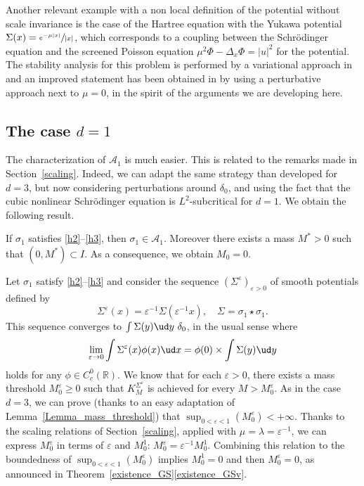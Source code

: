 \begin{rmk}
Another relevant example with
a non local definition of the potential without scale invariance is the case of the Hartree equation with the Yukawa potential $\Sigma(x)=\sfrac{e^{-\mu|x|}}{|x|}$,
which corresponds to a coupling between the Schrödinger equation and the screened Poisson equation $\mu^{2}\Phi-\Delta_{x}\Phi=|u|^{2}$
for the potential.
The stability analysis for this problem is performed by a variational approach in \cite{Zhang}
and an improved statement has been obtained in \cite{jmaa} by using a perturbative approach next to $\mu=0$, in the spirit of the arguments we are developing here.
\end{rmk}

\subsection{The case $d=1$}
The characterization of $\mathscr{A}_{1}$ is much easier. This is related to the remarks made in Section~\ref{scaling}. Indeed, we can adapt the same strategy than developed for $d=3$, but now considering perturbations around $\delta_{0}$, and using the fact that the cubic nonlinear Schrödinger equation is $L^{2}$-subcritical for $d=1$. We obtain the following result.

\begin{proposition}\label{non_perturbative_L+_d=1}
If $\sigma_{1}$ satisfies \eqref{h2}--\eqref{h3}, then $\sigma_{1}\in \mathscr{A}_{1}$. Moreover there exists a mass $M^{*}>0$ such that $(0,M^{*})\subset I$. As a consequence, we obtain $M_{0}=0$.
\end{proposition}

Let $\sigma_{1}$ satisfy \eqref{h2}--\eqref{h3} and consider the sequence $(\Sigma^{\varepsilon})_{\varepsilon>0}$ of smooth potentials defined by
\[
\Sigma^{\varepsilon}(x)=\varepsilon^{-1}\Sigma(\varepsilon^{-1}x), \quad \Sigma=\sigma_{1}\star\sigma_{1}.
\]
This sequence converges to $\int \Sigma(y)\ud y\ \delta_{0}$, in the usual sense where
\[
\lim_{\varepsilon \to 0}\int \Sigma^\varepsilon(x)\phi(x)\ud x=\phi(0)\times \int \Sigma(y)\ud y
\]
holds for any $\phi\in C^0_c(\mathbb R)$. We know that for each $\varepsilon>0$, there exists a mass threshold $M_{0}^{\varepsilon}\geq 0$ such that $K_{M}^{\Sigma^{\varepsilon}}$ is achieved for every $M>M_{0}^{\varepsilon}$. As in the case $d=3$, we can prove (thanks to an easy adaptation of Lemma~\ref{Lemma_mass_threshold}) that $\sup_{0<\varepsilon<1}(M_{0}^{\varepsilon})<+\infty$.
Thanks to the scaling relations of Section~\ref{scaling}, applied with $\mu=\lambda=\varepsilon^{-1}$, we can express $M_{0}^{\varepsilon}$ in terms of $\varepsilon$ and $M_{0}^{1}$: $M_{0}^{\varepsilon}=\varepsilon^{-1}M_{0}^{1}$. Combining this relation to the boundedness of $\sup_{0<\varepsilon<1}(M_{0}^{\varepsilon})$ implies $M_{0}^{1}=0$ and then $M_{0}^{\varepsilon}=0$, as announced in Theorem~\ref{existence_GS}\eqref{existence_GSv}.


